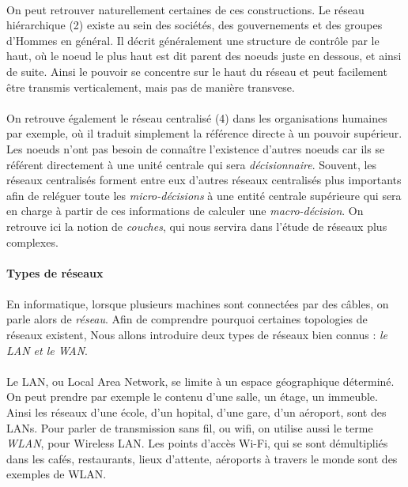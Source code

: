 \paragraph{} On peut retrouver naturellement certaines de ces constructions. Le réseau hiérarchique (2) existe
au sein des sociétés, des gouvernements et des groupes d'Hommes en général. Il décrit généralement une structure
de contrôle par le haut, où le noeud le plus haut est dit parent des noeuds juste en dessous, et ainsi de suite.
Ainsi le pouvoir se concentre sur le haut du réseau et peut facilement être transmis verticalement, mais pas de 
manière transvese.

\paragraph{} On retrouve également le réseau centralisé (4) dans les organisations humaines par exemple,
où il traduit simplement la référence directe à un pouvoir supérieur. Les noeuds n'ont pas besoin de connaître
l'existence d'autres noeuds car ils se référent directement à une unité centrale qui sera \emph{décisionnaire}.
Souvent, les réseaux centralisés forment entre eux d'autres réseaux centralisés plus importants afin de reléguer
toute les \emph{micro-décisions} à une entité centrale supérieure qui sera en charge à partir de ces informations
de calculer une \emph{macro-décision}. On retrouve ici la notion de \emph{couches}, qui nous servira dans l'étude
de réseaux plus complexes.

\paragraph{Types de réseaux}

\paragraph{} En informatique, lorsque plusieurs machines sont connectées par des câbles, on
parle alors de \emph{réseau}. Afin de comprendre pourquoi certaines topologies de réseaux 
existent, Nous allons introduire deux types de réseaux bien connus : \emph{le LAN et le WAN}.

\paragraph{} Le LAN, ou Local Area Network, se limite à un espace géographique déterminé. On peut prendre
par exemple le contenu d'une salle, un étage, un immeuble. Ainsi les réseaux d'une école, d'un
hopital, d'une gare, d'un aéroport, sont des LANs. Pour parler de transmission sans fil, ou
wifi, on utilise aussi le terme \emph{WLAN}, pour Wireless LAN. Les points d'accès Wi-Fi, qui se
sont démultipliés dans les cafés, restaurants, lieux d'attente, aéroports à travers le monde
sont des exemples de WLAN.

